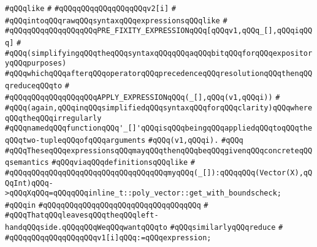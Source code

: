 \verb|#qQQqlike|\newline
\verb|#|\newline
\verb|#qQQqqQQqqQQqqQQqqQQqv2[i]|\newline
\verb|#|\newline
\verb|#qQQqintoqQQqrawqQQqsyntaxqQQqexpressionsqQQqlike|\newline
\verb|#|\newline
\verb|#qQQqqQQqqQQqqQQqqQQqPRE_FIXITY_EXPRESSIONqQQq[qQQqv1,qQQq_[],qQQqiqQQq]|\newline
\verb|#|\newline
\verb|#qQQq(simplifyingqQQqtheqQQqsyntaxqQQqqQQqaqQQqbitqQQqforqQQqexpositoryqQQqpurposes)|\newline
\verb|#qQQqwhichqQQqafterqQQqoperatorqQQqprecedenceqQQqresolutionqQQqthenqQQqreduceqQQqto|\newline
\verb|#|\newline
\verb|#qQQqqQQqqQQqqQQqqQQqAPPLY_EXPRESSIONqQQq(_[],qQQq(v1,qQQqi))|\newline
\verb|#|\newline
\verb|#qQQq(again,qQQqinqQQqsimplifiedqQQqsyntaxqQQqforqQQqclarity)qQQqwhereqQQqtheqQQqirregularly|\newline
\verb|#qQQqnamedqQQqfunctionqQQq'_[]'qQQqisqQQqbeingqQQqappliedqQQqtoqQQqtheqQQqtwo-tupleqQQqofqQQqarguments|\newline
\verb|#qQQq(v1,qQQqi).|\newline
\verb|#qQQq|\newline
\verb|#qQQqTheseqQQqexpressionsqQQqmayqQQqthenqQQqbeqQQqgivenqQQqconcreteqQQqsemantics|\newline
\verb|#qQQqviaqQQqdefinitionsqQQqlike|\newline
\verb|#|\newline
\verb|#qQQqqQQqqQQqqQQqqQQqqQQqqQQqqQQqqQQqmyqQQq(_[]):qQQqqQQq(Vector(X),qQQqInt)qQQq->qQQqXqQQq=qQQqqQQqinline_t::poly_vector::get_with_boundscheck;|\newline
\verb|#qQQqin|\newline
\verb|#qQQqqQQqqQQqqQQqqQQqqQQqqQQqqQQqqQQq|\newline
\verb|#|\newline
\verb|#qQQqThatqQQqleavesqQQqtheqQQqleft-handqQQqside.qQQqqQQqWeqQQqwantqQQqto|\newline
\verb|#qQQqsimilarlyqQQqreduce|\newline
\verb|#|\newline
\verb|#qQQqqQQqqQQqqQQqqQQqv1[i]qQQq:=qQQqexpression;|\newline
